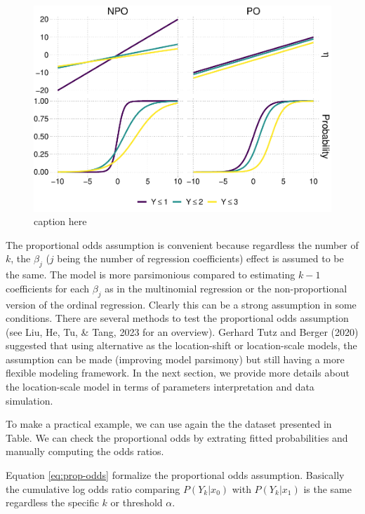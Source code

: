 \documentclass[
  man,floatsintext]{apa6}
\begin{document}
\scriptsize

\begin{figure}

{\centering \includegraphics{paper-new_files/figure-latex/fig-prop-odds-1} 

}

\caption{caption here}\label{fig:fig-prop-odds}
\end{figure}

\normalsize

The proportional odds assumption is convenient because regardless the number of \(k\), the \(\beta_j\) (\(j\) being the number of regression coefficients) effect is assumed to be the same. The model is more parsimonious compared to estimating \(k - 1\) coefficients for each \(\beta_j\) as in the multinomial regression or the non-proportional version of the ordinal regression. Clearly this can be a strong assumption in some conditions. There are several methods to test the proportional odds assumption (see Liu, He, Tu, \& Tang, 2023 for an overview). Gerhard Tutz and Berger (2020) suggested that using alternative as the location-shift or location-scale models, the assumption can be made (improving model parsimony) but still having a more flexible modeling framework. In the next section, we provide more details about the location-scale model in terms of parameters interpretation and data simulation.

To make a practical example, we can use again the the dataset presented in Table. We can check the proportional odds by extrating fitted probabilities and manually computing the odds ratios.

Equation \eqref{eq:prop-odds} formalize the proportional odds assumption. Basically the cumulative log odds ratio comparing \(P(Y_k|x_0)\) with \(P(Y_k|x_1)\) is the same regardless the specific \(k\) or threshold \(\alpha\).
\end{document}
